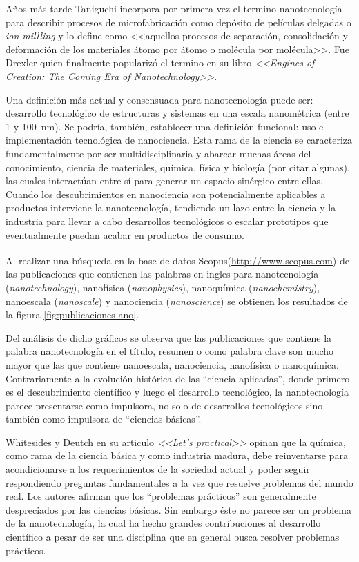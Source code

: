 	 Años más tarde Taniguchi incorpora por primera vez el termino nanotecnología para describir procesos de microfabricación como depósito de películas delgadas o \textit{ion millling} y lo define como <<aquellos procesos de separación, consolidación y deformación de los materiales átomo por átomo o molécula por molécula>>. \cite{taniguchi1974} Fue Drexler quien finalmente popularizó el termino en su libro \textit{<<Engines of Creation: The Coming Era of Nanotechnology>>}\cite{drexler1987}. 

	 Una definición más actual y consensuada para nanotecnología puede ser: desarrollo tecnológico de estructuras y sistemas en una escala nanométrica (entre 1 y \SI{100}{\nm}). Se podría, también, establecer una definición funcional: uso e implementación tecnológica de nanociencia. Esta rama de la ciencia se caracteriza fundamentalmente por ser multidisciplinaria y abarcar muchas áreas del conocimiento, ciencia de materiales, química, física y biología (por citar algunas), las cuales interactúan entre sí para generar un espacio sinérgico entre ellas. Cuando los descubrimientos en nanociencia son potencialmente aplicables a productos interviene la nanotecnología, tendiendo un lazo entre la ciencia y la industria para llevar a cabo desarrollos tecnológicos o escalar prototipos que eventualmente puedan acabar en productos de consumo.
	
	 Al realizar una búsqueda en la base de datos Scopus\textsuperscript\textregistered (\url{http://www.scopus.com}) de las publicaciones que contienen las palabras en ingles para nanotecnología (\textit{nanotechnology}), nanofísica (\textit{nanophysics}), nanoquímica (\textit{nanochemistry}), nanoescala (\textit{nanoscale}) y nanociencia (\textit{nanoscience}) se obtienen los resultados de la figura \ref{fig:publicaciones-ano}. 

	 Del análisis de dicho gráficos se observa que las publicaciones que contiene la palabra nanotecnología en el título, resumen o como palabra clave son mucho mayor que las que contiene nanoescala, nanociencia, nanofísica o nanoquímica. Contrariamente a la evolución histórica de las ``ciencia aplicadas'', donde primero es el descubrimiento científico y luego el desarrollo tecnológico, la nanotecnología parece presentarse como impulsora, no solo de desarrollos tecnológicos sino también como impulsora de ``ciencias básicas''.

	 Whitesides y Deutch en su articulo \textit{<<Let's practical>>} opinan que la química, como rama de la ciencia básica y como industria madura, debe reinventarse para acondicionarse a los requerimientos de la sociedad actual y poder seguir respondiendo preguntas fundamentales a la vez que resuelve problemas del mundo real. Los autores afirman que los ``problemas prácticos'' son generalmente despreciados por las ciencias básicas. \cite{Burdass2010} Sin embargo éste no parece ser un problema de la nanotecnología, la cual ha hecho grandes contribuciones al desarrollo científico a pesar de ser una disciplina que en general busca resolver problemas prácticos.
			
